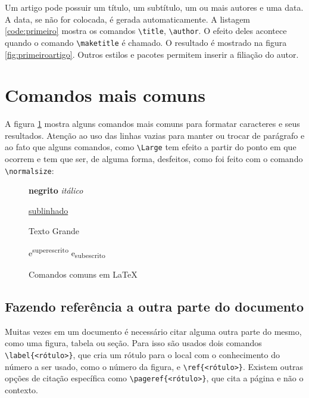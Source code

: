 Um artigo pode possuir um título, um subtítulo, um ou mais autores e uma data. A data, se não for colocada, é gerada automaticamente. A listagem \ref{code:primeiro} mostra os comandos \lstinline|\title|, \lstinline|\author|. O efeito deles acontece quando o comando \lstinline|\maketitle| é chamado. O resultado é mostrado na figura \ref{fig:primeiroartigo}. 
Outros estilos e pacotes permitem inserir a filiação do autor.

\section{Comandos mais comuns}

A figura \ref{fig:com:comum} mostra alguns comandos mais comuns para
formatar caracteres e seus resultados. Atenção ao uso das
linhas vazias para manter ou trocar de parágrafo e ao fato que alguns comandos, como \lstinline|\Large| tem efeito
a partir do ponto em que ocorrem e tem que ser, de alguma forma, desfeitos, como foi feito com o comando \lstinline|\normalsize|:

\begin{figure}[hbt]
    \begin{LTXexample}[pos=b]
\textbf{negrito} 
\textit{itálico}

\underline{sublinhado}

\Large
Texto Grande
\normalsize

e\textsuperscript{superescrito}
e\textsubscript{subescrito}
    \end{LTXexample}
    \caption{Comandos comuns em \LaTeX}
    \label{fig:com:comum}
\end{figure}

\subsection{Fazendo referência a outra parte do documento}

Muitas vezes em um documento é necessário citar alguma outra parte do mesmo, como uma figura, tabela ou seção. Para isso são usados dois comandos \lstinline|\label{<rótulo>}|, que cria um rótulo para o local com o conhecimento do número a ser usado, como o número da figura, e \lstinline|\ref{<rótulo>}|. Existem outras opções de citação específica como \lstinline|\pageref{<rótulo>}|, que cita a página e não o contexto.

